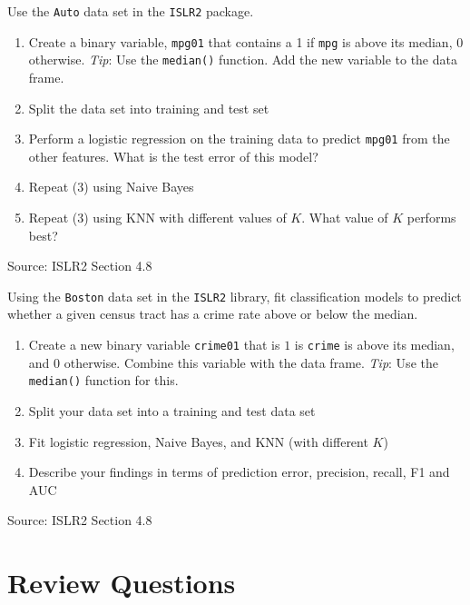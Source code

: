 \begin{withcode}
\begin{exerciseboxcomputer}
Use the \texttt{Auto} data set in the \texttt{ISLR2} package.
\begin{enumerate}
   \item Create a binary variable, \texttt{mpg01} that contains a 1 if \texttt{mpg} is above its median, 0 otherwise. \emph{Tip}: Use the \texttt{median()} function. Add the new variable to the data frame.
   \item Split the data set into training and test set
   \item Perform a logistic regression on the training data to predict \texttt{mpg01} from the other features. What is the test error of this model?
   \item Repeat (3) using Naive Bayes
   \item Repeat (3) using KNN with different values of $K$. What value of $K$ performs best?
\end{enumerate}
{\footnotesize \vspace{\baselineskip} Source: ISLR2 Section 4.8}
\end{exerciseboxcomputer}

\begin{exerciseboxcomputer}
Using the \texttt{Boston} data set in the \texttt{ISLR2} library, fit classification models to predict whether a given census tract has a crime rate above or below the median.
\begin{enumerate}
   \item Create a new binary variable \texttt{crime01} that is $1$ is \texttt{crime} is above its median, and $0$ otherwise. Combine this variable with the data frame. \emph{Tip}: Use the \texttt{median()} function for this.
   \item Split your data set into a training and test data set
   \item Fit logistic regression, Naive Bayes, and KNN (with different $K$)
   \item Describe your findings in terms of prediction error, precision, recall, F1 and AUC
\end{enumerate}
{\footnotesize \vspace{\baselineskip} Source: ISLR2 Section 4.8}
\end{exerciseboxcomputer}
\end{withcode}

\section{Review Questions}

